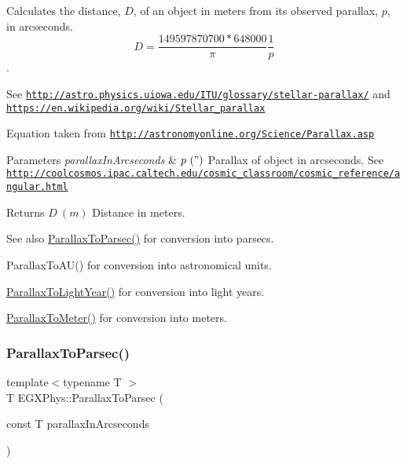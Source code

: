 Calculates the distance, $D$, of an object in meters from its observed parallax, $p$, in arcseconds. \[ D=\dfrac{149597870700 * 648000}{\pi}\dfrac{1}{p}\]. 

See \href{http://astro.physics.uiowa.edu/ITU/glossary/stellar-parallax/}{\tt http\+://astro.\+physics.\+uiowa.\+edu/\+I\+T\+U/glossary/stellar-\/parallax/} and \href{https://en.wikipedia.org/wiki/Stellar_parallax}{\tt https\+://en.\+wikipedia.\+org/wiki/\+Stellar\+\_\+parallax}

Equation taken from \href{http://astronomyonline.org/Science/Parallax.asp}{\tt http\+://astronomyonline.\+org/\+Science/\+Parallax.\+asp}


\begin{DoxyParams}{Parameters}
{\em parallax\+In\+Arcseconds} & $ p\ (")$ Parallax of object in arcseconds. See \href{http://coolcosmos.ipac.caltech.edu/cosmic_classroom/cosmic_reference/angular.html}{\tt http\+://coolcosmos.\+ipac.\+caltech.\+edu/cosmic\+\_\+classroom/cosmic\+\_\+reference/angular.\+html} \\
\hline
\end{DoxyParams}
\begin{DoxyReturn}{Returns}
$ D\ (m)$ Distance in meters. 
\end{DoxyReturn}
\begin{DoxySeeAlso}{See also}
\mbox{\hyperlink{group___e_g_x_phys-_astrophysic-_parallax_gab42dbec142e1a47925fc45e899845861}{Parallax\+To\+Parsec()}} for conversion into parsecs. 

Parallax\+To\+A\+U() for conversion into astronomical units. 

\mbox{\hyperlink{group___e_g_x_phys-_astrophysic-_parallax_gacaec31498f264e2a1dc285062a394de2}{Parallax\+To\+Light\+Year()}} for conversion into light years. 

\mbox{\hyperlink{group___e_g_x_phys-_astrophysic-_parallax_ga94912bf8b98a04cccab8ef19eaa89b6a}{Parallax\+To\+Meter()}} for conversion into meters. 
\end{DoxySeeAlso}
\mbox{\label{group___e_g_x_phys-_astrophysic-_parallax_gab42dbec142e1a47925fc45e899845861}} 
\subsubsection{\texorpdfstring{Parallax\+To\+Parsec()}{ParallaxToParsec()}}
{\footnotesize\ttfamily template$<$typename T $>$ \\
T E\+G\+X\+Phys\+::\+Parallax\+To\+Parsec (\begin{DoxyParamCaption}\item[{const T}]{parallax\+In\+Arcseconds }\end{DoxyParamCaption})}




